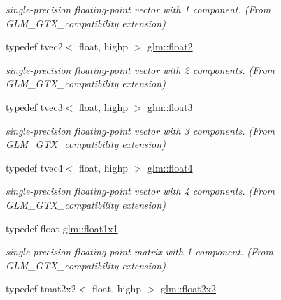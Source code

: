 \begin{DoxyCompactItemize}
\begin{DoxyCompactList}\small\item\em single-\/precision floating-\/point vector with 1 component. (From G\-L\-M\-\_\-\-G\-T\-X\-\_\-compatibility extension) \end{DoxyCompactList}\item 
\hypertarget{group__gtx__compatibility_ga3174e387d3b89c5dcff485c4e665a68c}{typedef tvec2$<$ float, highp $>$ \hyperlink{group__gtx__compatibility_ga3174e387d3b89c5dcff485c4e665a68c}{glm\-::float2}}\label{group__gtx__compatibility_ga3174e387d3b89c5dcff485c4e665a68c}

\begin{DoxyCompactList}\small\item\em single-\/precision floating-\/point vector with 2 components. (From G\-L\-M\-\_\-\-G\-T\-X\-\_\-compatibility extension) \end{DoxyCompactList}\item 
\hypertarget{group__gtx__compatibility_ga25f20d2c12f9b5f3917467e92899ea5a}{typedef tvec3$<$ float, highp $>$ \hyperlink{group__gtx__compatibility_ga25f20d2c12f9b5f3917467e92899ea5a}{glm\-::float3}}\label{group__gtx__compatibility_ga25f20d2c12f9b5f3917467e92899ea5a}

\begin{DoxyCompactList}\small\item\em single-\/precision floating-\/point vector with 3 components. (From G\-L\-M\-\_\-\-G\-T\-X\-\_\-compatibility extension) \end{DoxyCompactList}\item 
\hypertarget{group__gtx__compatibility_ga05e1940d91deb4bbe819881bf65dc52d}{typedef tvec4$<$ float, highp $>$ \hyperlink{group__gtx__compatibility_ga05e1940d91deb4bbe819881bf65dc52d}{glm\-::float4}}\label{group__gtx__compatibility_ga05e1940d91deb4bbe819881bf65dc52d}

\begin{DoxyCompactList}\small\item\em single-\/precision floating-\/point vector with 4 components. (From G\-L\-M\-\_\-\-G\-T\-X\-\_\-compatibility extension) \end{DoxyCompactList}\item 
\hypertarget{group__gtx__compatibility_gaac1faa940ac1fbb32d4a315005b578af}{typedef float \hyperlink{group__gtx__compatibility_gaac1faa940ac1fbb32d4a315005b578af}{glm\-::float1x1}}\label{group__gtx__compatibility_gaac1faa940ac1fbb32d4a315005b578af}

\begin{DoxyCompactList}\small\item\em single-\/precision floating-\/point matrix with 1 component. (From G\-L\-M\-\_\-\-G\-T\-X\-\_\-compatibility extension) \end{DoxyCompactList}\item 
\hypertarget{group__gtx__compatibility_ga577dc885086d068647175794909bc026}{typedef tmat2x2$<$ float, highp $>$ \hyperlink{group__gtx__compatibility_ga577dc885086d068647175794909bc026}{glm\-::float2x2}}\label{group__gtx__compatibility_ga577dc885086d068647175794909bc026}


\end{DoxyCompactItemize}
